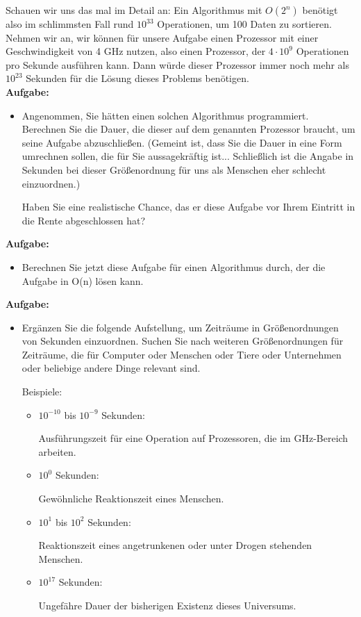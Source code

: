 Schauen wir uns das mal im Detail an: Ein Algorithmus mit \(O(2^n)\) benötigt also im schlimmsten Fall rund \(10^{33}\) Operationen, um 100 Daten zu sortieren. Nehmen wir an, wir können für unsere Aufgabe einen Prozessor mit einer Geschwindigkeit von 4 GHz nutzen, also einen Prozessor, der \(4 \cdot 10^9\) Operationen pro Sekunde ausführen kann. Dann würde dieser Prozessor immer noch mehr als \(10^{23}\) Sekunden für die Lösung dieses Problems benötigen.\\

\textbf{Aufgabe:}

\begin{itemize}
	\item Angenommen, Sie hätten einen solchen Algorithmus programmiert. Berechnen Sie die Dauer, die dieser auf dem genannten Prozessor braucht, um seine Aufgabe abzuschließen. (Gemeint ist, dass Sie die Dauer in eine Form umrechnen sollen, die für Sie aussagekräftig ist... Schließlich ist die Angabe in Sekunden bei dieser Größenordnung für uns als Menschen eher schlecht einzuordnen.) 
	
	Haben Sie eine realistische Chance, das er diese Aufgabe vor Ihrem Eintritt in die Rente abgeschlossen hat?
\end{itemize}

\textbf{Aufgabe:}

\begin{itemize}
	\item Berechnen Sie jetzt diese Aufgabe für einen Algorithmus durch, der die Aufgabe in O(n) lösen kann.
\end{itemize}

\textbf{Aufgabe:}

\begin{itemize}
	\item Ergänzen Sie die folgende Aufstellung, um Zeiträume in Größenordnungen von Sekunden einzuordnen. Suchen Sie nach weiteren Größenordnungen für Zeiträume, die für Computer oder Menschen oder Tiere oder Unternehmen oder beliebige andere Dinge relevant sind.
	
	Beispiele:
	
	\begin{itemize}
		\item \(10^{-10}\) bis \(10^{-9}\) Sekunden:
		
		 Ausführungszeit für eine Operation auf Prozessoren, die im GHz-Bereich arbeiten.
		\item \(10^0\) Sekunden: 
		
		Gewöhnliche Reaktionszeit eines Menschen.
		\item \(10^1\) bis \(10^2\) Sekunden:
		
		 Reaktionszeit eines angetrunkenen oder unter Drogen stehenden Menschen.
		\item \(10^{17}\) Sekunden: 
		
		Ungefähre Dauer der bisherigen Existenz dieses Universums.
	\end{itemize}
\end{itemize}

